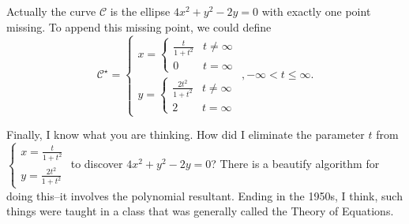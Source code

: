 \documentclass[12pt,fleqn,answers]{exam}
\begin{document}
\begin{questions}
\begin{parts}
\begin{solution}[3.5in]
\quad Actually the curve $\mathcal{C}$ is the ellipse $4 x^2 + y^2 - 2 y = 0$
with exactly one point missing.  To append this missing point, we could define
\begin{equation*}
  \mathcal{C}^\star = 
  \begin{cases} x =  \begin{cases} \frac{t}{1+t^2} & t \neq \infty \\
                                  0 & t = \infty 
                     \end{cases} \\ 
              y = \begin{cases}  \frac{2t^2}{1+ t^2} & t \neq \infty \\
                                  2 & t = \infty
              \end{cases}
              \end{cases},  
  -\infty < t \leq \infty.
\end{equation*}

\quad Finally, I know what you are thinking.  How did I eliminate the parameter $t$ from  $\begin{cases} x =  \frac{t}{1+t^2} \\ y = \frac{2t^2}{1+ t^2} 
\end{cases}$ to discover $4 x^2 + y^2 - 2 y = 0$?  There is a beautify algorithm for doing this--it involves the polynomial
resultant. Ending in the 1950s, I think, such things were taught in a class that was generally called the Theory of Equations.


\end{solution}

\end{parts}
\end{questions}
    
\end{document}
